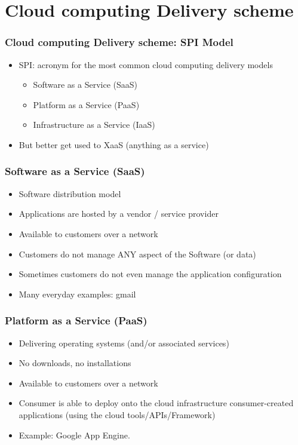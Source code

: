 \documentclass{beamer}
\begin{document}
\section{Cloud computing Delivery scheme}

\begin{frame}
\frametitle{Cloud computing Delivery scheme: SPI Model}
\begin{itemize}
  \item SPI: acronym for the most common cloud computing delivery models 
     \begin{itemize}
     \item Software as a Service (SaaS)
     \item Platform as a Service (PaaS) 
     \item Infrastructure as a Service (IaaS)
     \end{itemize}
  \item But better get used to XaaS (anything as a service)
\end{itemize}
\end{frame}
\begin{frame}
\frametitle{Software as a Service (SaaS)}
\begin{itemize}
  \item Software distribution model 
  \item Applications are hosted by a vendor / service provider
  \item Available to customers over a network 
  \item Customers do not manage ANY aspect of the Software (or data)
  \item Sometimes customers do not even manage the application configuration
  \item Many everyday examples: gmail
\end{itemize}
\end{frame}

\begin{frame}
\frametitle{Platform as a Service (PaaS)}
\begin{itemize}
  \item Delivering operating systems (and/or associated services)
  \item No downloads, no installations
  \item Available to customers over a network
  \item Consumer is able to deploy onto the cloud infrastructure consumer-created applications (using the cloud tools/APIs/Framework)
  \item Example: Google App Engine. 
\end{itemize}
\end{frame}
\end{document}
